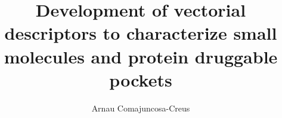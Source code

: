 \title{Development of vectorial descriptors to characterize small molecules and protein druggable pockets}
\author{Arnau Comajuncosa-Creus}



